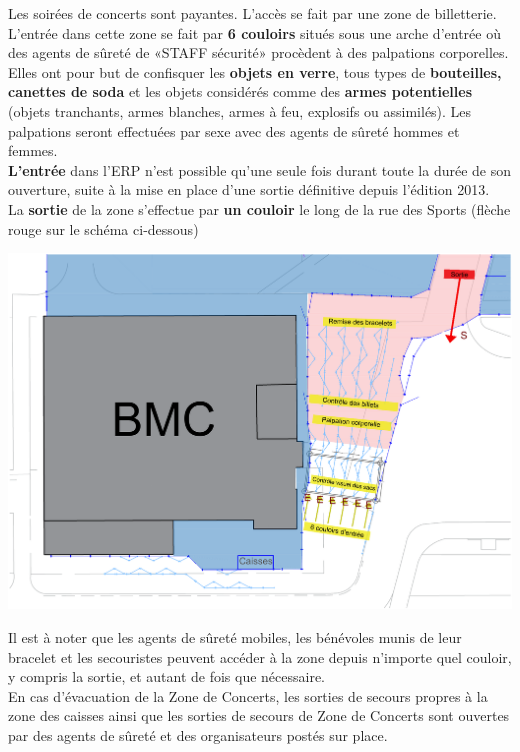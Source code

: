 \documentclass[hidelinks, paper=a4, fontsize=13pt]{report}
\begin{document}
Les soirées de concerts sont payantes. L’accès se fait par une zone de billetterie. L’entrée dans cette zone se fait par \textbf{6 couloirs} situés sous une arche d’entrée où des agents de sûreté de «STAFF sécurité» procèdent à des palpations corporelles. \\

Elles ont pour but de confisquer les \textbf{objets en verre}, tous types de \textbf{bouteilles, canettes de soda} et les objets considérés comme des \textbf{armes potentielles} (objets tranchants, armes blanches, armes à feu, explosifs ou assimilés). 
Les palpations seront effectuées par sexe avec des agents de sûreté hommes et femmes.\\

\textbf{L’entrée} dans l’ERP n’est possible qu’une seule fois durant toute la durée de son ouverture, suite à la mise en place d’une sortie définitive depuis l’édition 2013. \\
La \textbf{sortie} de la zone s’effectue par \textbf{un couloir} le long de la rue des Sports (flèche rouge sur le schéma ci-dessous)

\begin{center}
	\includegraphics[width=.8\textwidth,keepaspectratio]{Exports/Plan_24h_45eme-Entree_Etapes}
\end{center}

Il est à noter que les agents de sûreté mobiles, les bénévoles munis de leur bracelet et les secouristes peuvent accéder à la zone depuis n’importe quel couloir, y compris la sortie, et autant de fois que nécessaire.\\

En cas d’évacuation de la Zone de Concerts, les sorties de secours propres à la zone des caisses  ainsi que les sorties de secours de Zone de Concerts sont ouvertes par des agents de sûreté et des organisateurs postés sur place. 
\end{document}
